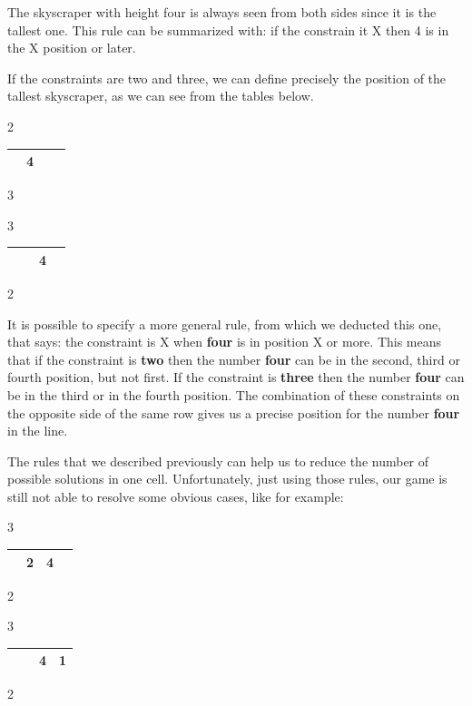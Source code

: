\documentclass[12pt]{report}
\begin{document}
\begin{itemize}
    The skyscraper with height four is always seen from both sides since
    it is the tallest one. This rule can be summarized with: if the
    constrain it X then 4 is in the X position or later.

    If the constraints are two and three, we can define precisely the
    position of the tallest skyscraper, as we can see from the tables
    below.

\begin{center}
  2
  \begin{tabular}{| C{0.5cm} | C{0.5cm} | C{0.5cm} | C{0.5cm} |}
    \hline
    & 4 &  &  \tabularnewline \hline
  \end{tabular}
  3
\end{center}

\begin{center}
  3
  \begin{tabular}{| C{0.5cm} | C{0.5cm} | C{0.5cm} | C{0.5cm} |}
    \hline
    &  & 4 &  \tabularnewline \hline
  \end{tabular}
  2
\end{center}

    It is possible to specify a more general rule, from which we deducted
    this one, that says: the constraint is X when \textbf{four} is in
    position X or more. This means that if the constraint is \textbf{two}
    then the number \textbf{four} can be in the second, third or fourth
    position, but not first. If the constraint is \textbf{three} then the
    number \textbf{four} can be in the third or in the fourth position.
    The combination of these constraints on the opposite side of the same
    row gives us a precise position for the number \textbf{four} in the
    line.

\end{itemize}

The rules that we described previously can help us to reduce the number of
possible solutions in one cell. Unfortunately, just using those rules, our
game is still not able to resolve some obvious cases, like for example:

\begin{center}
  3
  \begin{tabular}{| C{0.5cm} | C{0.5cm} | C{0.5cm} | C{0.5cm} |}
    \hline
    & 2 & 4 &  \tabularnewline \hline
  \end{tabular}
  2
\end{center}

\begin{center}
  3
  \begin{tabular}{| C{0.5cm} | C{0.5cm} | C{0.5cm} | C{0.5cm} |}
    \hline
    &  & 4 & 1 \tabularnewline \hline
  \end{tabular}
  2
\end{center}
\end{document}
